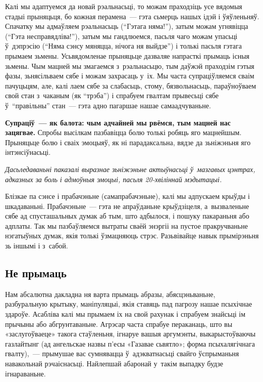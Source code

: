 Калі мы адаптуемся да новай рэальнасьці, то можам праходзіць усе вядомыя стадыі прыняцьця, бо кожная перамена~--- гэта сьмерць нашых ідэй і ўяўленьняў. Спачатку мы адмаўляем рэальнасьць (``Гэтага няма!''), затым можам угнявіцца (``Гэта несправядліва!''), затым мы гандлюемся, пасьля чаго можам упасьці ў~дэпрэсію (``Няма сэнсу мяняцца, нічога ня выйдзе'') і толькі пасьля гэтага прымаем зьмены. Усьвядомленае прыняцьце дазваляе напрасткі прымаць існыя зьмены. Чым мацней мы змагаемся з~рэальнасьцю, тым даўжэй праходзім гэтыя фазы, зьнясільваем сябе і можам захрасаць у~іх. Мы часта супраціўляемся сваім пачуцьцям, але, калі лаем сябе за слабасьць, стому, бязвольнасьць, параўноўваем свой стан з~чаканым (як ``трэба'') і спрабуем гвалтам прывесьці сябе ў~``правільны'' стан~--- гэта адно пагаршае нашае самаадчуваньне.

\textbf{Супраціў~--- як балота: чым адчайней мы рвёмся, тым мацней нас зацягвае.} Спробы высілкам пазбавіцца болю толькі робяць яго мацнейшым. Прыняцьце болю і сваіх эмоцыяў, як ні парадаксальна, вядзе да зьніжэньня яго інтэнсіўнасьці.

\emph{Дасьледаваньні паказалі выразнае зьніжэньне актыўнасьці ў~мазгавых цэнтрах, адказных за боль і адмоўныя эмоцыі, пасьля 20-хвіліннай мэдытацыі.}

Блізкае па сэнсе і прабачэньне (самапрабачэньне), калі мы адпускаем крыўды і шкадаваньні. Прабачэньне~--- гэта не апраўданьне крыўдзіцеля, а~вызваленьне сябе ад спусташальных думак аб тым, што адбылося, і пошуку пакараньня або адплаты. Так мы пазбаўляемся вытраты сваёй энэргіі на пустое пракручваньне нэгатыўных думак, якія толькі ўзмацняюць стрэс. Разьвівайце навык прымірэньня зь іншымі і з~сабой.

\subsection*{Не прымаць}

Нам абсалютна дакладна ня варта прымаць абразы, абясцэньваньне, разбуральную крытыку, маніпуляцыі, якія ставяць пад пагрозу нашае псыхічнае здароўе. Асабліва калі мы прымаем іх на свой рахунак і спрабуем знайсьці ім прычыны або абгрунтаваньне. Агрэсар часта спрабуе пераканаць, што вы «заслугоўваеце» такога стаўленьня, ігнаруе вашыя аргумэнты, выкарыстоўваючы газлайтынг (ад ангельскае назвы п'есы «Газавае сьвятло»; форма псыхалягічнага гвалту),~--- прымушае вас сумнявацца ў~адэкватнасьці свайго ўспрыманьня навакольнай рэчаіснасьці. Найлепшай абаронай у~такім выпадку будзе ігнараваньне.


